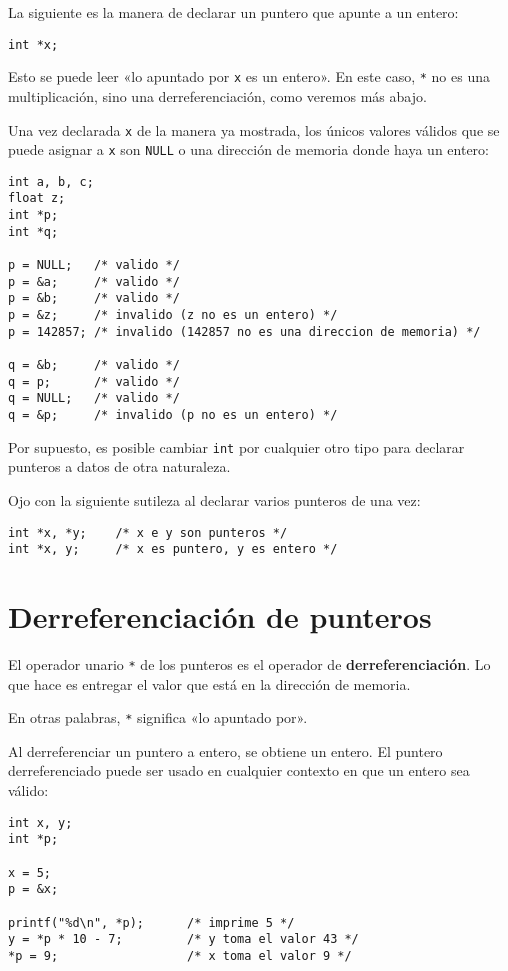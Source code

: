 La siguiente es la manera de declarar un puntero que apunte a un entero:

\begin{lstlisting}
int *x;
\end{lstlisting}

Esto se puede leer «lo apuntado por \lstinline!x! es un entero». En este
caso, \lstinline!*! no es una multiplicación, sino una
derreferenciación, como veremos más abajo.

Una vez declarada \lstinline!x! de la manera ya mostrada, los únicos
valores válidos que se puede asignar a \lstinline!x! son
\lstinline!NULL! o una dirección de memoria donde haya un entero:

\begin{lstlisting}
int a, b, c;
float z;
int *p;
int *q;

p = NULL;   /* valido */
p = &a;     /* valido */
p = &b;     /* valido */
p = &z;     /* invalido (z no es un entero) */
p = 142857; /* invalido (142857 no es una direccion de memoria) */

q = &b;     /* valido */
q = p;      /* valido */
q = NULL;   /* valido */
q = &p;     /* invalido (p no es un entero) */
\end{lstlisting}

Por supuesto, es posible cambiar \lstinline!int! por cualquier otro tipo
para declarar punteros a datos de otra naturaleza.

Ojo con la siguiente sutileza al declarar varios punteros de una vez:

\begin{lstlisting}
int *x, *y;    /* x e y son punteros */
int *x, y;     /* x es puntero, y es entero */
\end{lstlisting}

\section{Derreferenciación de punteros}

El operador unario \lstinline!*! de los punteros es el operador de
\textbf{derreferenciación}. Lo que hace es entregar el valor que está en
la dirección de memoria.

En otras palabras, \lstinline!*! significa «lo apuntado por».

Al derreferenciar un puntero a entero, se obtiene un entero. El puntero
derreferenciado puede ser usado en cualquier contexto en que un entero
sea válido:

\begin{lstlisting}
int x, y;
int *p;

x = 5;
p = &x;

printf("%d\n", *p);      /* imprime 5 */
y = *p * 10 - 7;         /* y toma el valor 43 */
*p = 9;                  /* x toma el valor 9 */
\end{lstlisting}


